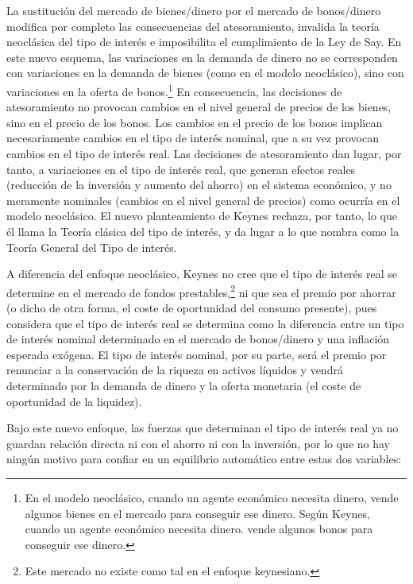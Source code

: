 \documentclass[10pt,a4paper]{article}
\begin{document}
La sustitución del mercado de bienes/dinero por el mercado de bonos/dinero modifica por completo las consecuencias del atesoramiento, invalida la teoría neoclásica del tipo de interés e imposibilita el cumplimiento de la Ley de Say. En este nuevo esquema, las variaciones en la demanda de dinero no se corresponden con variaciones en la demanda de bienes (como en el modelo neoclásico), sino con variaciones en la oferta de bonos.\footnote{%
    En el modelo neoclásico, cuando un agente económico necesita dinero, vende algunos bienes en el mercado para conseguir ese dinero. Según Keynes, cuando un agente económico necesita dinero. vende algunos bonos para conseguir ese dinero.
} En consecuencia, las decisiones de atesoramiento no provocan cambios en el nivel general de precios de los bienes, sino en el precio de los bonos. Los cambios en el precio de los bonos implican necesariamente cambios en el tipo de interés nominal, que a su vez provocan cambios en el tipo de interés real. Las decisiones de atesoramiento dan lugar, por tanto, a variaciones en el tipo de interés real, que generan efectos reales (reducción de la inversión y aumento del ahorro) en el sistema económico, y no meramente nominales (cambios en el nivel general de precios) como ocurría en el modelo neoclásico. El nuevo planteamiento de Keynes rechaza, por tanto, lo que él llama la Teoría clásica del tipo de interés, y da lugar a lo que nombra como la Teoría General del Tipo de interés. 

A diferencia del enfoque neoclásico, Keynes no cree que el tipo de interés real se determine en el mercado de fondos prestables,\footnote{Este mercado no existe como tal en el enfoque keynesiano.} ni que sea el premio por ahorrar (o dicho de otra forma, el coste de oportunidad del consumo presente), pues considera que el tipo de interés real se determina como la diferencia entre un tipo de interés nominal determinado en el mercado de bonos/dinero y una inflación esperada exógena. El tipo de interés nominal, por su parte, será el premio por renunciar a la conservación de la riqueza en activos líquidos y vendrá determinado por la demanda de dinero y la oferta monetaria (el coste de oportunidad de la liquidez). 

Bajo este nuevo enfoque, las fuerzas que determinan el tipo de interés real ya no guardan relación directa ni con el ahorro ni con la inversión, por lo que no hay ningún motivo para confiar en un equilibrio automático entre estas dos variables:
\end{document}
